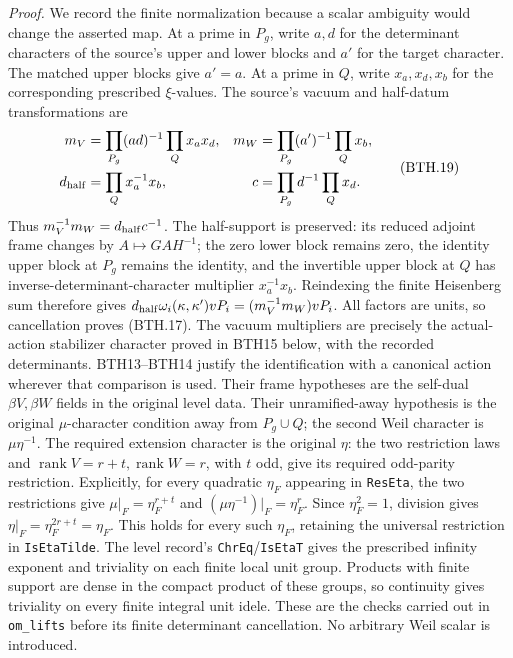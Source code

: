 \emph{Proof.}
We record the finite normalization because a scalar ambiguity
would change the asserted map.  At a prime in \(P_g\), write
\(a,d\) for the determinant characters of the source's upper
and lower blocks and \(a'\) for the target character.  The
matched upper blocks give \(a'=a\).  At a prime in \(Q\), write
\(x_a,x_d,x_b\) for the corresponding prescribed \(\xi\)-values.
The source's vacuum and half-datum transformations are
\[
 \begin{aligned}
 m_V&=\prod_{P_g}(ad)^{-1}\prod_Q x_ax_d,&
 m_W&=\prod_{P_g}(a')^{-1}\prod_Q x_b,\\
 d_{\rm half}&=\prod_Q x_a^{-1}x_b,&
 c&=\prod_{P_g}d^{-1}\prod_Q x_d .
 \end{aligned}                                                  \tag{BTH.19}
\]
Thus \(m_V^{-1}m_W=d_{\rm half}c^{-1}\).
The half-support is preserved: its reduced adjoint frame
changes by \(A\mapsto GAH^{-1}\); the zero lower block
remains zero, the identity upper block at \(P_g\) remains
the identity, and the invertible upper block at \(Q\)
has inverse-determinant-character multiplier
\(x_a^{-1}x_b\).  Reindexing the finite Heisenberg sum therefore
gives
\(d_{\rm half}\omega_i(\kappa,\kappa')vP_i
   =(m_V^{-1}m_W)vP_i\).
All factors are units, so cancellation proves (BTH.17).
The vacuum multipliers are precisely the actual-action
stabilizer character proved in BTH15 below, with the recorded
determinants.  BTH13--BTH14 justify the identification with a
canonical action wherever that comparison is used.  Their
frame hypotheses are the self-dual
\(\beta V,\beta W\) fields in the original level data.
Their unramified-away hypothesis is the original
\(\mu\)-character condition away from \(P_g\cup Q\);
the second Weil character is \(\mu\eta^{-1}\).
The required extension character is the original \(\eta\):
the two restriction laws and
\(\operatorname{rank}V=r+t,\operatorname{rank}W=r\),
with \(t\) odd, give its required odd-parity restriction.
Explicitly, for every quadratic \(\eta_F\) appearing in
\texttt{Res\allowbreak Eta}, the two restrictions give
\(\mu|_F=\eta_F^{r+t}\) and
\((\mu\eta^{-1})|_F=\eta_F^r\).  Since
\(\eta_F^2=1\), division gives
\(\eta|_F=\eta_F^{2r+t}=\eta_F\).
This holds for every such \(\eta_F\), retaining the universal
restriction in \texttt{Is\allowbreak Eta\allowbreak Tilde}.
The level record's \texttt{Chr\allowbreak Eq}/\texttt{Is\allowbreak Eta\allowbreak T} gives the
prescribed infinity exponent and triviality on each finite
local unit group.  Products with finite support are dense in
the compact product of these groups, so continuity gives
triviality on every finite integral unit idele.
These are the checks carried out in
\texttt{om\_\allowbreak lifts} before its finite determinant cancellation.
No arbitrary Weil scalar is introduced.


